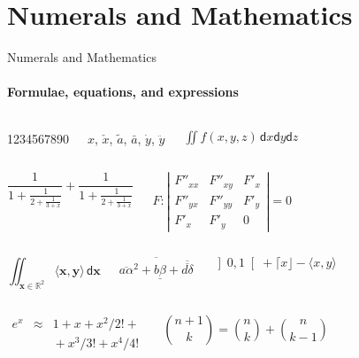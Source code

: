 \section{Numerals and Mathematics}

\begin{frame}{Numerals and Mathematics}
\framesubtitle{Formulae, equations, and expressions}
\begin{columns}
1234567890


$\hat{x}$, $\check{x}$, $\tilde{a}$, $\bar{a}$, $\dot{y}$, $\ddot{y}$

$\iint f(x,y,z)\,\mathsf{d}x\mathsf{d}y\mathsf{d}z$
\end{columns}

\begin{columns}
\begin{equation*}
    \frac{1}{\displaystyle 1+
            \frac{1}{\displaystyle 2+
            \frac{1}{\displaystyle 3+x}}} +
            \frac{1}{1+\frac{1}{2+\frac{1}{3+x}}}
\end{equation*}

\begin{equation*}
    F:\left| \begin{array}{ccc}
          F''_{xx} & F''_{xy} &  F'_x \\
          F''_{yx} & F''_{yy} &  F'_y \\
          F'_x     & F'_y     & 0
          \end{array}\right| = 0
\end{equation*}
\end{columns}

\begin{columns}
\begin{equation*}
    \iint_{\mathbf{x} \in \mathbb{R}^2} \langle \mathbf{x},\mathbf{y}\rangle\,\mathsf{d}\mathbf{x}
\end{equation*}

\begin{equation*}
    \overline{\overline{a\alpha}^2+\underline{b\beta}
          +\overline{\overline{d\delta}}}
\end{equation*}

\begin{equation*}
    \left] 0,1\right[ + \lceil x \rfloor - \langle x,y\rangle
\end{equation*}
\end{columns}

\begin{columns}
\begin{eqnarray*}
    e^x &\approx& 1+x+x^2/2! + \\
        && {}+x^3/3! + x^4/4!
\end{eqnarray*}

\begin{equation*}
    \binom{n+1}{k} = \binom{n}{k} + \binom{n}{k-1}
\end{equation*}
\end{columns}
\end{frame}
